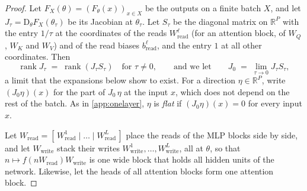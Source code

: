 \documentclass[10pt]{article}
\theoremstyle{definition}
\theoremstyle{remark}
\newcommand{\R}{\mathbb{R}}
\newcommand{\Wread}{W_{\mathrm{read}}}
\newcommand{\Wwrite}{W_{\mathrm{write}}}
\newcommand{\Der}{\mathrm{D}}
\begin{document}
\begin{proof}
Let $F_X(\theta) = (F_\theta(x))_{x \in X}$ be the outputs on a finite batch $X$, and let $J_\tau = \Der_\theta F_X(\theta_\tau)$ be its Jacobian at $\theta_\tau$. Let $S_\tau$ be the diagonal matrix on $\R^P$ with the entry $1/\tau$ at the coordinates of the reads $\Wread^{\ell}$ (for an attention block, of $W_Q$, $W_K$ and $W_V$) and of the read biases $b^{\ell}_{\mathrm{read}}$, and the entry $1$ at all other coordinates. Then
\[
\operatorname{rank} J_\tau \;=\; \operatorname{rank}(J_\tau S_\tau) \quad\text{for } \tau \neq 0, \qquad\text{and we let}\qquad J_0 \;=\; \lim_{\tau \to 0} J_\tau S_\tau ,
\]
a limit that the expansions below show to exist. For a direction $\eta \in \R^P$, write $(J_0\eta)(x)$ for the part of $J_0\,\eta$ at the input $x$, which does not depend on the rest of the batch. As in \cref{app:onelayer}, $\eta$ is \emph{flat} if $(J_0\eta)(x) = 0$ for every input $x$.

Let $\Wread = [\,\Wread^{1} \mid \dots \mid \Wread^{L}\,]$ place the reads of the MLP blocks side by side, and let $\Wwrite$ stack their writes $\Wwrite^{1}, \dots, \Wwrite^{L}$, all at $\theta$, so that $n \mapsto f(n\Wread)\Wwrite$ is one wide block that holds all hidden units of the network. Likewise, let the heads of all attention blocks form one attention block.


\end{proof}
\end{document}
